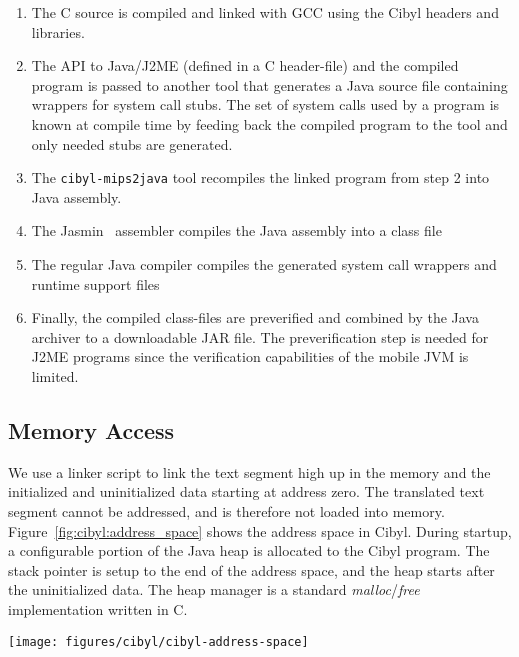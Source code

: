 \begin{enumerate}
\item The C source is compiled and linked with GCC using the Cibyl headers and
  libraries.
\item The API to Java/J2ME (defined in a C header-file) and the compiled
  program is passed to another tool that generates a Java source file
  containing wrappers for system call stubs.  The set of system calls used by
  a program is known at compile time by feeding back the compiled program to
  the tool and only needed stubs are generated.
\item The \texttt{cibyl-mips2java} tool recompiles the linked program from
  step 2 into Java assembly.
\item The Jasmin~\cite{jasmin} assembler compiles the Java assembly into a class
  file
\item The regular Java compiler compiles the generated system call wrappers and
  runtime support files
\item Finally, the compiled class-files are preverified and combined by the
  Java archiver to a downloadable JAR file. The preverification step is needed
  for J2ME programs since the verification capabilities of the mobile JVM is
  limited.
\end{enumerate}


\subsection{Memory Access}
\label{sec:cibyl:cibyl:memory}
We use a linker script to link the text segment high up in the memory and the
initialized and uninitialized data starting at address zero. The translated
text segment cannot be addressed, and is therefore not loaded into memory.
Figure~\ref{fig:cibyl:address_space} shows the address space in Cibyl. During
startup, a configurable portion of the Java heap is allocated to the Cibyl
program. The stack pointer is setup to the end of the address space, and the
heap starts after the uninitialized data. The heap manager is a standard
\emph{malloc}/\emph{free} implementation written in C.

\begin{figure*}[thb]
  \begin{center}
    \texttt{[image: figures/cibyl/cibyl-address-space]}
    \caption[Cibyl address space]{Cibyl address space. The end of the address space depends on the
      available memory}
    \label{fig:cibyl:address_space}
  \end{center}
\end{figure*}


